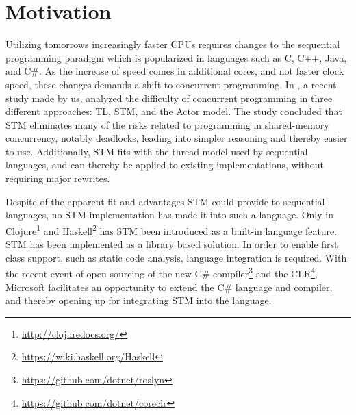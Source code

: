 \makeatletter {}\makeatother
{}
%
\section{Motivation}
Utilizing tomorrows increasingly faster \acp{CPU} requires changes to the sequential programming paradigm which is popularized in languages such as C, C++, Java, and C\#. As the increase of speed comes in additional cores, and not faster clock speed\cite{sutter2005free}, these changes demands a shift to concurrent programming. In \cite{dpt907e14trending}, a recent study made by us, analyzed the difficulty of concurrent programming in three different approaches: \ac{TL}, \ac{STM}, and the Actor model. The study concluded that \ac{STM} eliminates many of the risks related to programming in shared-memory concurrency, notably deadlocks, leading into simpler reasoning and thereby easier to use. Additionally, \ac{STM} fits with the thread model used by sequential languages, and can thereby be applied to existing implementations, without requiring major rewrites.

Despite of the apparent fit and advantages \ac{STM} could provide to sequential languages, no \ac{STM} implementation has made it into such a language. Only in Clojure\footnote{\url{http://clojuredocs.org/}} and Haskell\footnote{\url{https://wiki.haskell.org/Haskell}} has \ac{STM} been introduced as a built-in language feature. \ac{STM} has been implemented as a library based solution. In order to enable first class support, such as static code analysis, language integration is required. With the recent event of open sourcing of the new C\# compiler\footnote{\url{https://github.com/dotnet/roslyn}} and the \ac{CLR}\footnote{\url{https://github.com/dotnet/coreclr}}, Microsoft facilitates an opportunity to extend the C\# language and compiler, and thereby opening up for integrating \ac{STM} into the language.




